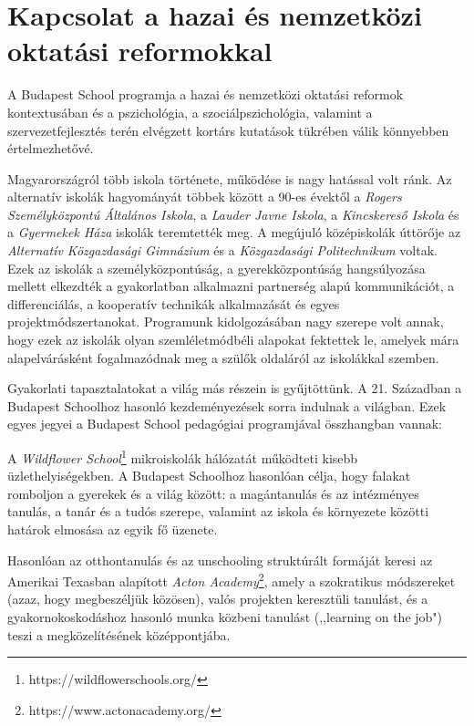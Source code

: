 \section{Kapcsolat a hazai és nemzetközi oktatási reformokkal}
\label{sec:kapcsolat_reformokkal}

A Budapest School programja a hazai és nemzetközi oktatási reformok
kontextusában és a pszichológia, a szociálpszichológia, valamint a
szervezetfejlesztés terén elvégzett kortárs kutatások tükrében válik
könnyebben értelmezhetővé.

Magyarországról több iskola története, működése is nagy hatással volt ránk. Az
alternatív iskolák hagyományát többek között a 90-es évektől a \emph{Rogers
      Személyközpontú Általános Iskola}, a \emph{Lauder Javne Iskola}, a
\emph{Kincskereső
      Iskola} és a \emph{Gyermekek Háza} iskolák teremtették meg.  A megújuló
középiskolák úttörője az \emph{Alternatív Közgazdasági Gimnázium} és a
\emph{Közgazdasági Politechnikum} voltak. Ezek az iskolák a személyközpontúság,
a gyerekközpontúság hangsúlyozása mellett elkezdték a gyakorlatban
alkalmazni partnerség alapú kommunikációt, a differenciálás, a kooperatív
technikák alkalmazását és
egyes projektmódszertanokat. Programunk kidolgozásában nagy szerepe volt
annak, hogy ezek az iskolák olyan szemléletmódbéli alapokat fektettek
le, amelyek mára alapelvárásként fogalmazódnak meg a szülők oldaláról az
iskolákkal szemben.

Gyakorlati tapasztalatokat a világ más részein is gyűjtöttünk. A 21.
Században a Budapest Schoolhoz hasonló kezdeményezések sorra indulnak a
világban. Ezek egyes jegyei a Budapest School pedagógiai programjával
összhangban vannak:

A \emph{Wildflower School}\footnote{https://wildflowerschools.org/}
mikroiskolák hálózatát működteti kisebb
üzlethelyiségekben. A Budapest Schoolhoz hasonlóan célja, hogy falakat
romboljon a gyerekek és a világ között: a magántanulás és az intézményes
tanulás, a tanár és a tudós szerepe, valamint az iskola és környezete
közötti határok elmosása az egyik fő üzenete.

Hasonlóan az otthontanulás és az  unschooling struktúrált formáját keresi az
Amerikai Texasban alapított \emph{Acton
      Academy}\footnote{https://www.actonacademy.org/}, amely a szokratikus
módszereket (azaz,
hogy megbeszéljük közösen), valós projekten keresztüli tanulást, és a
gyakornokoskodáshoz hasonló munka közbeni tanulást (,,learning on the job")
teszi a megközelítésének középpontjába.

